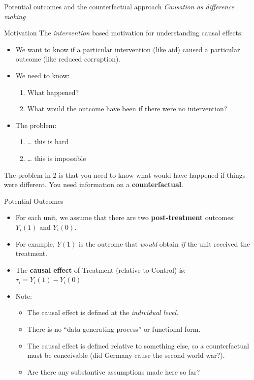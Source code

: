 \documentclass[
  11pt,
  ignorenonframetext,
]{beamer}
\providecommand{\tightlist}{%
  \setlength{\itemsep}{0pt}\setlength{\parskip}{0pt}}\usepackage{longtable,booktabs,array}
\begin{document}
\begin{frame}{Potential outcomes and the counterfactual approach}
\emph{Causation as difference making}
\end{frame}

\begin{frame}{Motivation \label{po}}
\protect\hypertarget{motivation}{}
The \emph{intervention} based motivation for understanding causal
effects:

\begin{itemize}
\tightlist
\item
  We want to know if a particular intervention (like aid) caused a
  particular outcome (like reduced corruption).
\item
  We need to know:

  \begin{enumerate}
  \tightlist
  \item
    What happened?
  \item
    What would the outcome have been if there were no intervention?
  \end{enumerate}
\item
  The problem:

  \begin{enumerate}
  \tightlist
  \item
    \ldots{} this is hard
  \item
    \ldots{} this is impossible
  \end{enumerate}
\end{itemize}

The problem in 2 is that you need to know what would have happened if
things were different. You need information on a
\textbf{counterfactual}.
\end{frame}

\begin{frame}{Potential Outcomes}
\protect\hypertarget{potential-outcomes}{}
\begin{itemize}
\tightlist
\item
  For each unit, we assume that there are two \textbf{post-treatment}
  outcomes: \(Y_i(1)\) and \(Y_i(0)\).
\item
  For example, \(Y(1)\) is the outcome that \emph{would} obtain
  \emph{if} the unit received the treatment.
\item
  The \textbf{causal effect} of Treatment (relative to Control) is:
  \(\tau_i = Y_i(1) - Y_i(0)\)
\item
  Note:

  \begin{itemize}
  \tightlist
  \item
    The causal effect is defined at the \emph{individual level}.
  \item
    There is no ``data generating process'' or functional form.
  \item
    The causal effect is defined relative to something else, so a
    counterfactual must be conceivable (did Germany cause the second
    world war?).
  \item
    Are there any substantive assumptions made here so far?
  \end{itemize}
\end{itemize}
\end{frame}
\end{document}
